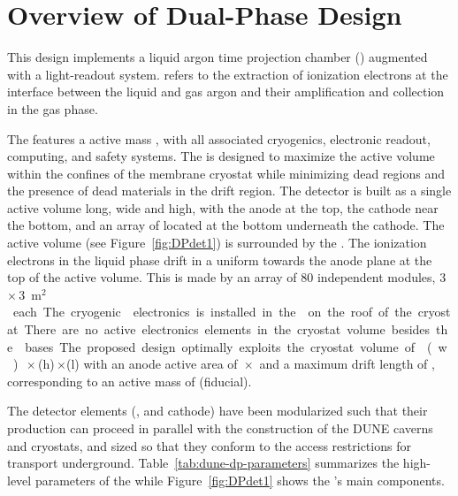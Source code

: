 





\section{Overview of Dual-Phase Design}
\label{sec:fddp-ov-description}

This \dual design implements a \dual liquid argon time projection chamber (\lartpc) augmented with a light-readout system.  \textit{\dual} refers to the extraction of ionization electrons at the interface between the liquid and gas argon and their amplification and collection in the gas phase.

The  features a  \dpactivelarmass active mass \lartpc, with all associated cryogenics, electronic readout, computing, and safety systems. The  is designed to maximize the active volume within the confines of the membrane cryostat while minimizing dead regions and the presence of dead materials in the drift region. The detector is built as a single active volume \dptpclen long, \dptpcwdth wide and \tpcheight high, with the anode at the top, the cathode near the bottom, and an array of  located  at the bottom %
underneath the cathode. The active volume (see Figure~\ref{fig:DPdet1}) is surrounded by the . The ionization electrons in the liquid phase drift  in a uniform \efield towards the anode plane at the top of the active volume. This is made by an array of \num{80} independent  modules, \num{3}\,$\times$\,\SI{3}{m$^2$} each. The cryogenic  electronics is %
installed in the 
on the roof of the cryostat. There are no active electronics elements in the cryostat volume besides the  bases.
The proposed design optimally exploits the cryostat volume of \cryostatwdth{}(w)\,$\times$\,\cryostatht{}(h)\,$\times$\cryostatlen{}(l) with an anode active area of \dptpcwdth{}\,$\times$\,\cryostatlen{} and a maximum drift length of \dpmaxdrift{}, corresponding to an active \lar mass of \dpactivelarmass  (\dpfidlarmass fiducial). 

The detector elements (,  and cathode) have been modularized such that their production can proceed in parallel with the construction of the DUNE caverns and cryostats, and sized so that they conform to the access restrictions for transport underground. Table~\ref{tab:dune-dp-parameters} summarizes %
the high-level parameters of the  while Figure~\ref{fig:DPdet1} shows %
the 's main components.

